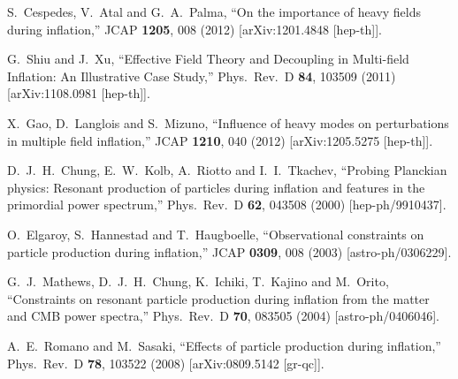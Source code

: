 \documentclass[12pt]{article}
\begin{document}
\begin{thebibliography}{99}
  S.~Cespedes, V.~Atal and G.~A.~Palma,
  ``On the importance of heavy fields during inflation,''
  JCAP {\bf 1205}, 008 (2012)
  [arXiv:1201.4848 [hep-th]].
  
  G.~Shiu and J.~Xu,
  ``Effective Field Theory and Decoupling in Multi-field Inflation: An Illustrative Case Study,''
  Phys.\ Rev.\ D {\bf 84}, 103509 (2011)
  [arXiv:1108.0981 [hep-th]].
  
  
  X.~Gao, D.~Langlois and S.~Mizuno,
  ``Influence of heavy modes on perturbations in multiple field inflation,''
  JCAP {\bf 1210}, 040 (2012)
  [arXiv:1205.5275 [hep-th]].
  




  D.~J.~H.~Chung, E.~W.~Kolb, A.~Riotto and I.~I.~Tkachev,
  ``Probing Planckian physics: Resonant production of particles during inflation and features in the primordial power spectrum,''
  Phys.\ Rev.\ D {\bf 62}, 043508 (2000)
  [hep-ph/9910437].
 
  O.~Elgaroy, S.~Hannestad and T.~Haugboelle,
  ``Observational constraints on particle production during inflation,''
  JCAP {\bf 0309}, 008 (2003)
  [astro-ph/0306229].
  
  G.~J.~Mathews, D.~J.~H.~Chung, K.~Ichiki, T.~Kajino and M.~Orito,
  ``Constraints on resonant particle production during inflation from the matter and CMB power spectra,''
  Phys.\ Rev.\ D {\bf 70}, 083505 (2004)
  [astro-ph/0406046].
  
  A.~E.~Romano and M.~Sasaki,
  ``Effects of particle production during inflation,''
  Phys.\ Rev.\ D {\bf 78}, 103522 (2008)
  [arXiv:0809.5142 [gr-qc]].
 

\end{thebibliography}
\end{document}
